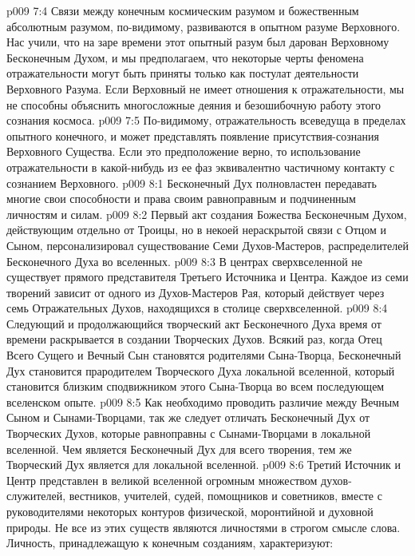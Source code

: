 \vs p009 7:4 \pc Связи между конечным космическим разумом и божественным абсолютным разумом, по\hyp{}видимому, развиваются в опытном разуме Верховного. Нас учили, что на заре времени этот опытный разум был дарован Верховному Бесконечным Духом, и мы предполагаем, что некоторые черты феномена отражательности могут быть приняты только как постулат деятельности Верховного Разума. Если Верховный не имеет отношения к отражательности, мы не способны объяснить многосложные деяния и безошибочную работу этого сознания космоса.
\vs p009 7:5 По\hyp{}видимому, отражательность всеведуща в пределах опытного конечного, и может представлять появление присутствия\hyp{}сознания Верховного Существа. Если это предположение верно, то использование отражательности в какой\hyp{}нибудь из ее фаз эквивалентно частичному контакту с сознанием Верховного.
\vs p009 8:1 Бесконечный Дух полновластен передавать многие свои способности и права своим равноправным и подчиненным личностям и силам.
\vs p009 8:2 Первый акт создания Божества Бесконечным Духом, действующим отдельно от Троицы, но в некоей нераскрытой связи с Отцом и Сыном, персонализировал существование Семи Духов\hyp{}Мастеров, распределителей Бесконечного Духа во вселенных.
\vs p009 8:3 В центрах сверхвселенной не существует прямого представителя Третьего Источника и Центра. Каждое из семи творений зависит от одного из Духов\hyp{}Мастеров Рая, который действует через семь Отражательных Духов, находящихся в столице сверхвселенной.
\vs p009 8:4 Следующий и продолжающийся творческий акт Бесконечного Духа время от времени раскрывается в создании Творческих Духов. Всякий раз, когда Отец Всего Сущего и Вечный Сын становятся родителями Сына\hyp{}Творца, Бесконечный Дух становится прародителем Творческого Духа локальной вселенной, который становится близким сподвижником этого Сына\hyp{}Творца во всем последующем вселенском опыте.
\vs p009 8:5 Как необходимо проводить различие между Вечным Сыном и Сынами\hyp{}Творцами, так же следует отличать Бесконечный Дух от Творческих Духов, которые равноправны с Сынами\hyp{}Творцами в локальной вселенной. Чем является Бесконечный Дух для всего творения, тем же Творческий Дух является для локальной вселенной.
\vs p009 8:6 \pc Третий Источник и Центр представлен в великой вселенной огромным множеством духов\hyp{}служителей, вестников, учителей, судей, помощников и советников, вместе с руководителями некоторых контуров физической, моронтийной и духовной природы. Не все из этих существ являются личностями в строгом смысле слова. Личность, принадлежащую к конечным созданиям, характеризуют:
